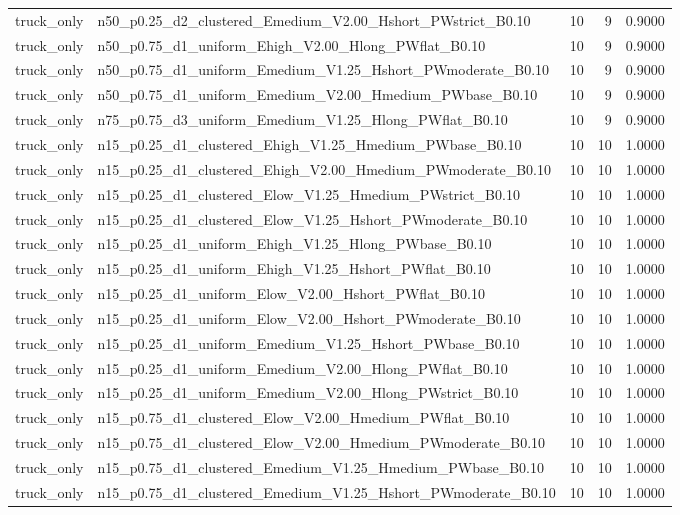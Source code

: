 \begin{tabular}{llrrr}
truck_only & n50_p0.25_d2_clustered_Emedium_V2.00_Hshort_PWstrict_B0.10 & 10 & 9 & 0.9000 \\
truck_only & n50_p0.75_d1_uniform_Ehigh_V2.00_Hlong_PWflat_B0.10 & 10 & 9 & 0.9000 \\
truck_only & n50_p0.75_d1_uniform_Emedium_V1.25_Hshort_PWmoderate_B0.10 & 10 & 9 & 0.9000 \\
truck_only & n50_p0.75_d1_uniform_Emedium_V2.00_Hmedium_PWbase_B0.10 & 10 & 9 & 0.9000 \\
truck_only & n75_p0.75_d3_uniform_Emedium_V1.25_Hlong_PWflat_B0.10 & 10 & 9 & 0.9000 \\
truck_only & n15_p0.25_d1_clustered_Ehigh_V1.25_Hmedium_PWbase_B0.10 & 10 & 10 & 1.0000 \\
truck_only & n15_p0.25_d1_clustered_Ehigh_V2.00_Hmedium_PWmoderate_B0.10 & 10 & 10 & 1.0000 \\
truck_only & n15_p0.25_d1_clustered_Elow_V1.25_Hmedium_PWstrict_B0.10 & 10 & 10 & 1.0000 \\
truck_only & n15_p0.25_d1_clustered_Elow_V1.25_Hshort_PWmoderate_B0.10 & 10 & 10 & 1.0000 \\
truck_only & n15_p0.25_d1_uniform_Ehigh_V1.25_Hlong_PWbase_B0.10 & 10 & 10 & 1.0000 \\
truck_only & n15_p0.25_d1_uniform_Ehigh_V1.25_Hshort_PWflat_B0.10 & 10 & 10 & 1.0000 \\
truck_only & n15_p0.25_d1_uniform_Elow_V2.00_Hshort_PWflat_B0.10 & 10 & 10 & 1.0000 \\
truck_only & n15_p0.25_d1_uniform_Elow_V2.00_Hshort_PWmoderate_B0.10 & 10 & 10 & 1.0000 \\
truck_only & n15_p0.25_d1_uniform_Emedium_V1.25_Hshort_PWbase_B0.10 & 10 & 10 & 1.0000 \\
truck_only & n15_p0.25_d1_uniform_Emedium_V2.00_Hlong_PWflat_B0.10 & 10 & 10 & 1.0000 \\
truck_only & n15_p0.25_d1_uniform_Emedium_V2.00_Hlong_PWstrict_B0.10 & 10 & 10 & 1.0000 \\
truck_only & n15_p0.75_d1_clustered_Elow_V2.00_Hmedium_PWflat_B0.10 & 10 & 10 & 1.0000 \\
truck_only & n15_p0.75_d1_clustered_Elow_V2.00_Hmedium_PWmoderate_B0.10 & 10 & 10 & 1.0000 \\
truck_only & n15_p0.75_d1_clustered_Emedium_V1.25_Hmedium_PWbase_B0.10 & 10 & 10 & 1.0000 \\
truck_only & n15_p0.75_d1_clustered_Emedium_V1.25_Hshort_PWmoderate_B0.10 & 10 & 10 & 1.0000 \\

\end{tabular}
